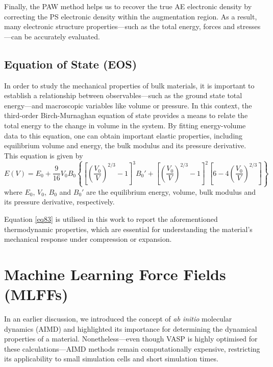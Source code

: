 Finally, the PAW method helps us to recover the true AE 
electronic density by correcting the PS 
electronic density within the augmentation region. As a result, 
many electronic structure properties---such as 
the total energy, forces and stresses---can be accurately evaluated.
\subsection{Equation of State (EOS)}
In order to study the mechanical properties of bulk materials, it is 
important to establish a relationship between observables---such as the 
ground state total energy---and macroscopic variables like volume or pressure. In this context, the 
third-order Birch-Murnaghan equation of state\supercite{Birch1947,poirier2000introduction} provides
a means to relate the total energy to the change in volume in the system. By fitting energy-volume data to this 
equation, one can obtain important elastic properties, including equilibrium volume and energy,
the bulk modulus and its pressure derivative. This equation is given by 
\begin{equation}
    \label{eq83}
     E(V) = E_0 + \frac{9}{16} V_0 B_0 \left\{ \left[ \left( \frac{V_0}{V} \right)^{2/3} 
     - 1 \right]^3 B_0' + \left[ \left( \frac{V_0}{V} \right)^{2/3} - 1 \right]^2 \left[6 - 4 \left( \frac{V_0}{V} \right)^{2/3} \right] \right\}
\end{equation}
where $E_0$, $V_0$, $B_0$ and $B_0'$ are the equilibrium energy, volume, bulk modulus and its pressure derivative, respectively.

Equation \ref{eq83} is utilised in this work to report the aforementioned thermodynamic
properties, which are essential for understanding the material's mechanical 
response under compression or expansion. 

\section{Machine Learning Force Fields (MLFFs)}
In an earlier discussion, we introduced the concept of \emph{ab initio} molecular 
dynamics (AIMD) and highlighted its importance for determining the 
dynamical properties of a material. Nonetheless---even though VASP is highly optimised for 
these calculations---AIMD methods remain computationally expensive, 
restricting its applicability to small simulation cells and 
short simulation times. 


